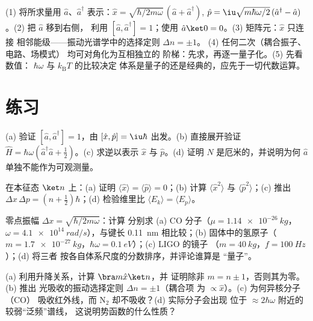 \begin{method}[振子代数]\label{met:b3:harmonic-oscillator:method}
(1) 将所求量用 $\hat a$、$\hat a^\dagger$ 表示：$\hat x
= \sqrt{\hbar/2m\omega}\,(\hat a + \hat a^\dagger)$, $\hat p =
\iu\sqrt{m\hbar\omega/2}\,(\hat a^\dagger - \hat a)$。(2) 把 $\hat a$ 移到右侧，
利用 $[\hat a, \hat a^\dagger] = 1$；使用
$\hat a\ket0 = 0$。(3) 矩阵元：$\hat x$ 只连接
相邻能级——振动光谱学中的选择定则 $\Delta n = \pm1$。
(4) 任何二次（耦合振子、电路、场模式）
均可对角化为互相独立的
阶梯：先求，再逐一量子化。(5) 先看数值：
$\hbar\omega$ 与 $k_{\text{B}}T$ 的比较决定
体系是量子的还是经典的，应先于一切代数运算。
\end{method}

\section{练习}

\begin{exercise}[$\star$]\label{exo:b3:harmonic-oscillator:1}
(a) 验证 $[\hat a, \hat a^\dagger] = 1$，由 $[\hat x, \hat p] =
\iu\hbar$ 出发。(b) 直接展开验证 $\hat H = \hbar\omega(\hat a^\dagger\hat a +
\tfrac12)$。(c) 求逆以表示 $\hat x$ 与
$\hat p$。(d) 证明 $\hat N$ 是厄米的，并说明为何 $\hat a$
单独不能作为可观测量。
\end{exercise}

\begin{exercise}[$\star$]\label{exo:b3:harmonic-oscillator:2}
在本征态 $\ket n$ 上：(a) 证明 $\langle\hat x\rangle =
\langle\hat p\rangle = 0$；(b) 计算 $\langle\hat x^2\rangle$ 与
$\langle\hat p^2\rangle$；(c) 推出 $\Delta x\,\Delta p = (n +
\tfrac12)\hbar$；(d) 检验维里比 $\langle E_k\rangle =
\langle E_p\rangle$。
\end{exercise}

\begin{exercise}[$\star$]\label{exo:b3:harmonic-oscillator:3}
零点振幅 $\Delta x = \sqrt{\hbar/2m\omega}$：计算
分别求 (a) CO 分子（$\mu = \qty{1.14e-26}{kg}$，$\omega =
\qty{4.1e14}{rad/s}$），与键长
\qty{0.11}{nm} 相比较；(b) 固体中的氢原子（$m =
\qty{1.7e-27}{kg}$，$\hbar\omega = \qty{0.1}{eV}$）；(c) LIGO 的镜子
（$m = \qty{40}{kg}$，$f = \qty{100}{Hz}$）；(d) 将三者
按各自体系尺度的分数排序，并评论谁算是
“量子”。
\end{exercise}

\begin{exercise}[$\star$]\label{exo:b3:harmonic-oscillator:4}
(a) 利用升降关系，计算 $\bra m\hat x\ket n$，并
证明除非 $m = n \pm 1$，否则其为零。(b) 推出
光吸收的振动选择定则 $\Delta n = \pm1$（耦合项
为 $\propto\hat x$）。(c) 为何异核分子（CO）
吸收红外线，而 N$_2$ 却不吸收？(d) 实际分子会出现
位于 $\approx 2\hbar\omega$ 附近的较弱“泛频”谱线，
这说明势函数的什么性质？
\end{exercise}

